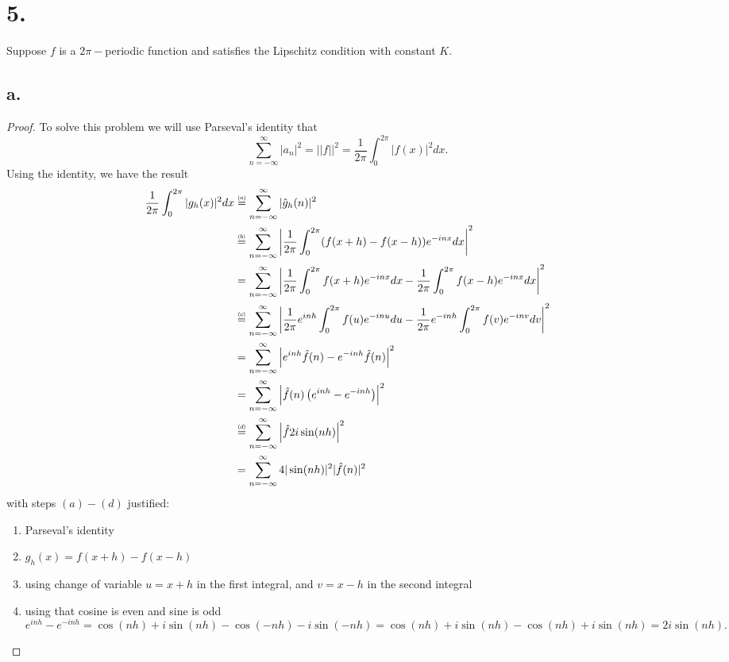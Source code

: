 \documentclass{article}
\newcommand\numeq[1]%
  {\stackrel{\scriptscriptstyle(\mkern-1.5mu#1\mkern-1.5mu)}{=}}
\begin{document}
\section*{5.}
Suppose $f$ is a $2\pi-$periodic function and satisfies the Lipschitz condition with constant $K$. 
\subsection*{a.}
\begin{proof}
To solve this problem we will use Parseval's identity that 
\[
 \sum\limits_{n = -\infty}^{\infty}|a_n|^2 = ||f||^2 = \frac{1}{2 \pi }\int_0^{2\pi}|f(x)|^2dx.   
\]
Using the identity, we have the result
\begin{align*}
    \frac{1}{2\pi }\int_0^{2 \pi }|g_h(x)|^2dx &\numeq{a} \sum\limits_{n = -\infty}^{\infty}|\hat{g}_h(n)|^2 \\
    &\numeq{b} \sum\limits_{n = -\infty}^{\infty}\left|\frac{1}{2\pi} \int_0^{2 \pi}(f(x + h) - f(x - h))e^{-inx}dx \right|^2 \\
    &= \sum\limits_{n = -\infty}^{\infty}\left|\frac{1}{2\pi}\int_0^{2 \pi}f(x + h)e^{-inx}dx - \frac{1}{2\pi}\int_0^{2 \pi}f(x - h)e^{-inx}dx \right|^2 \\
    &\numeq{c} \sum\limits_{n = -\infty}^{\infty}\left|\frac{1}{2\pi}e^{inh} \int_0^{2 \pi}f(u)e^{-inu}du - \frac{1}{2\pi}e^{-inh}\int_0^{2\pi}f(v)e^{-inv}dv \right|^2 \\
    &= \sum\limits_{n = -\infty}^{\infty}\left|e^{inh}\hat{f}(n) - e^{-inh}\hat{f}(n)\right|^2 \\
    &= \sum\limits_{n = -\infty}^{\infty}\left|\hat{f}(n)\left(e^{inh} - e^{-inh}\right)\right|^2 \\
    &\numeq{d} \sum\limits_{n = -\infty}^{\infty}\left|\hat{f}2i\sin(nh)\right|^2 \\
    &= \sum\limits_{n = -\infty}^{\infty}4|\sin(nh)|^2|\hat{f}(n)|^2
\end{align*}
with steps $(a)-(d)$ justified: 
\begin{enumerate}[\indent(a)]
   \item Parseval's identity
   \item $g_h(x) = f(x + h) - f(x- h)$
   \item using change of variable $u = x +h$ in the first integral, and $v = x - h$ in the second integral 
   \item using that cosine is even and sine is odd \[
   e^{inh} - e^{-inh} = \cos(nh) + i\sin(nh) - \cos(-nh) - i\sin(-nh) = \cos(nh) + i \sin(nh) - \cos(nh) + i\sin(nh) = 2i\sin(nh). 
\]
\end{enumerate}
\end{proof}
\end{document}
